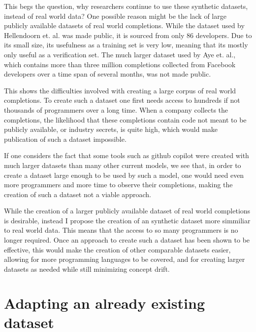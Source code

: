 \documentclass[sigplan,screen,9pt]{acmart}
\begin{document}
This begs the question, why researchers continue to use these synthetic datasets, instead of real world data?
One possible reason might be the lack of large publicly available datasets of real world completions.
While the dataset used by Hellendoorn et. al.\cite{8812116} was made public, it is sourced from only 86 developers.
Due to its small size, its usefulness as a training set is very low, meaning that its mostly only useful as a verification set.
The much larger dataset used by Aye et. al.\cite{https://doi.org/10.48550/arxiv.2011.04542}, which contains more than three million completions collected from Facebook developers over a time span of several months, was not made public.

This shows the difficulties involved with creating a large corpus of real world completions.
To create such a dataset one first needs access to hundreds if not thousands of programmers over a long time. When a company collects the completions, the likelihood that these completions contain code not meant to be publicly available, or industry secrets, is quite high, which would make publication of such a dataset impossible.

If one considers the fact that some tools such as github copilot were created with much larger datasets than many other current models\cite{2107.03374}, we see that, in order to create a dataset large enough to be used by such a model, one would need even more programmers and more time to observe their completions, making the creation of such a dataset not a viable approach.

While the creation of a larger publicly available dataset of real world completions is desirable, instead I propose the creation of an synthetic dataset more simmiliar to real world data.
This means that the access to so many programmers is no longer required. Once an approach to create such a dataset has been shown to be effective, this would make the creation of other comparable datasets easier, allowing for more programming languages to be covered, and for creating larger datasets as needed while still minimizing concept drift.


\section{Adapting an already existing dataset}
\end{document}
